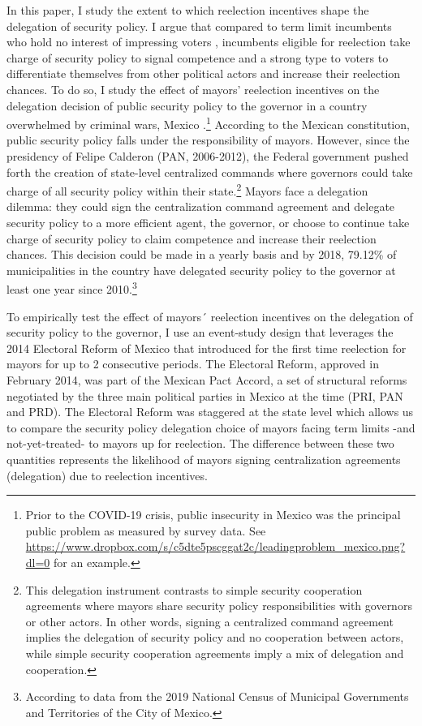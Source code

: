 \documentclass[12pt]{amsart}
\numberwithin{equation}{section}
\theoremstyle{definition}
\theoremstyle{definition}
\theoremstyle{definition}
\begin{document}
In this paper, I study the extent to which reelection incentives shape the delegation of security policy. I argue that compared to term limit incumbents who hold no interest of impressing voters \citep{ashworth_2012}, incumbents eligible for reelection take charge of security policy to signal competence and a strong type to voters to differentiate themselves from other political actors and increase their reelection chances.  To do so, I study the effect of mayors' reelection incentives on the delegation decision of public security policy to the governor in a country overwhelmed by criminal wars, Mexico \citep{ley_trejo_2020}.\footnote{Prior to the COVID-19 crisis, public insecurity in Mexico was the principal public problem as measured by survey data. See \url{https://www.dropbox.com/s/c5dte5pscggat2c/leadingproblem_mexico.png?dl=0} for an example.} According to the Mexican constitution, public security policy falls under the responsibility of mayors. However, since the presidency of Felipe Calderon (PAN, 2006-2012), the Federal government pushed forth the creation of state-level centralized commands where governors could take charge of all security policy within their state.\footnote{This delegation instrument contrasts to simple security cooperation agreements where mayors share security policy responsibilities with governors or other actors. In other words, signing a centralized command agreement implies the delegation of security policy and no cooperation between actors, while simple security cooperation agreements imply a mix of delegation and cooperation.} Mayors face a delegation dilemma: they could sign the centralization command agreement and delegate security policy to a more efficient agent, the governor, or choose to continue take charge of security policy to claim competence and increase their reelection chances. This decision could be made in a yearly basis and by 2018, 79.12\% of municipalities in the country have delegated security policy to the governor at least one year since 2010.\footnote{According to data from the 2019 National Census of Municipal Governments and Territories of the City of Mexico.} 
          
To empirically test the effect of mayors´ reelection incentives on the delegation of security policy to the governor, I use an event-study design that leverages the 2014 Electoral Reform of Mexico that introduced for the first time reelection for mayors for up to 2 consecutive periods. The Electoral Reform, approved in February 2014, was part of the Mexican Pact Accord, a set of structural reforms negotiated by the three main political parties in Mexico at the time (PRI, PAN and PRD). The Electoral Reform was staggered at the state level which allows us to compare the security policy delegation choice of mayors facing term limits -and not-yet-treated- to mayors up for reelection. The difference between these two quantities represents the likelihood of mayors signing centralization agreements (delegation) due to reelection incentives. 
          
\end{document}
